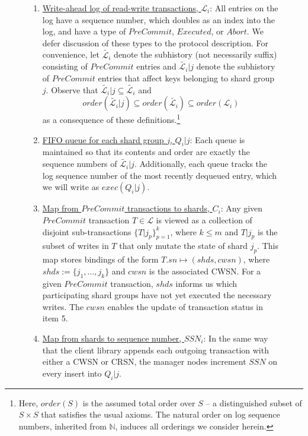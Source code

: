\documentclass{article}
\begin{document}
\begin{figure}[H]
  \vspace*{-2em}
  \centering
\begin{tcolorbox}[title= On \textbf{transaction manager node} $i$, enhanced, width=1.05\textwidth, left skip=-0.5cm, colback=black!4!white]  
\begin{enumerate}[itemsep=1pt]
\item \underline{Write-ahead log of read-write transactions, $\mathcal{L}_i$}: All entries on the log have a sequence number, which doubles as an index into the log, and have a type of $PreCommit$, $Executed$, or $Abort$. We defer discussion of these types to the protocol description. For convenience, let $\tilde{\mathcal{L}_i}$ denote the subhistory (not necessarily suffix) consisting of $PreCommit$ entries and $\tilde{\mathcal{L}_i}|j$ denote the subhistory of $PreCommit$ entries that affect keys belonging to shard group $j$. Observe that $\tilde{\mathcal{L}_i}|j \subseteq \tilde{\mathcal{L}_i}$ and  \begin{equation*}
    order\left(\tilde{\mathcal{L}_i}|j \right) \subseteq order\left(\tilde{\mathcal{L}_i} \right)\subseteq order(\mathcal{L}_i)
  \end{equation*}
  as a consequence of these definitions.\footnote{Here, $order(S)$ is the assumed total order over $S$ -- a distinguished subset of $S \times S$ that satisfies the usual axioms. The natural order on log sequence numbers, inherited from $\mathbb{N}$, induces all orderings we consider herein.}
\item \underline{FIFO queue for each shard group $j$, $Q_i|j$}: Each queue is maintained so that its contents and order are exactly the sequence numbers of $\tilde{\mathcal{L}_i}|j$. Additionally, each queue tracks the log sequence number of the most recently dequeued entry, which we will write as $exec(Q_i|j)$.
\item \underline{Map from $PreCommit$ transactions to shards, $C_i$}: Any given $PreCommit$ transaction $T \in \mathcal{L}$ is viewed as a collection of disjoint sub-transactions $\{T|j_p\}_{p=1}^k$, where $k \leq m$ and $T|j_p$ is the subset of writes in $T$ that only mutate the state of shard $j_p$. This map stores bindings of the form $T.sn \mapsto (shds, cwsn)$, where $shds  :=\{j_1,...,j_k\}$ and $cwsn$ is the associated CWSN. For a given $PreCommit$ transaction, $shds$ informs us which participating shard groups have not yet executed the necessary writes. The $cwsn$ enables the update of transaction status in item 5. 
\item \underline{Map from shards to sequence number, $SSN_i$}: In the same way that the client library appends each outgoing transaction with either a CWSN or CRSN, the manager nodes increment $SSN$ on every insert into $Q_i|j$. 

\end{enumerate}
\end{tcolorbox}
\end{figure}
\end{document}
